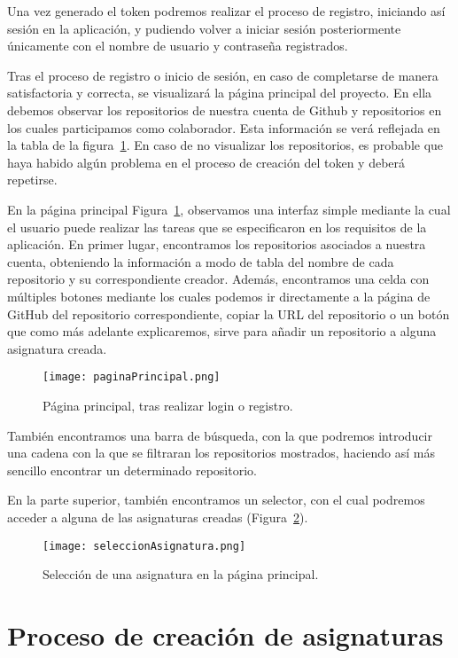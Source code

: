 Una vez generado el token podremos realizar el proceso de registro,
iniciando así sesión en la aplicación, y pudiendo volver a iniciar sesión
posteriormente únicamente con el nombre de usuario y contraseña
registrados.


Tras el proceso de registro o inicio de sesión, en caso de completarse de
manera satisfactoria y correcta, se visualizará la página principal del
proyecto. En ella debemos observar los repositorios de nuestra cuenta de
Github y repositorios en los cuales participamos como colaborador. Esta
información se verá reflejada en la tabla de la
figura~\ref{figure:mainPage}. En caso de no visualizar los repositorios, es
probable que haya habido algún problema en el proceso de creación del token
y deberá repetirse.

En la página principal Figura~\ref{figure:mainPage}, observamos una
interfaz simple mediante la cual el usuario puede realizar las tareas que
se especificaron en los requisitos de la aplicación. En primer lugar,
encontramos los repositorios asociados a nuestra cuenta, obteniendo la
información a modo de tabla del nombre de cada repositorio y su
correspondiente creador. Además, encontramos una celda con múltiples
botones mediante los cuales podemos ir directamente a la página de GitHub
del repositorio correspondiente, copiar la URL del repositorio o un botón
que como más adelante explicaremos, sirve para añadir un repositorio a
alguna asignatura creada.

\begin{figure}[h!]
  \texttt{[image: paginaPrincipal.png]}
  \caption{Página principal, tras realizar login o registro.}
  \label{figure:mainPage}
\end{figure}

También encontramos una barra de búsqueda, con la que podremos introducir
una cadena con la que se filtraran los repositorios mostrados, haciendo así
más sencillo encontrar un determinado repositorio.

En la parte superior, también encontramos un selector, con el cual podremos
acceder a alguna de las asignaturas creadas
(Figura~\ref{figure:mainPageSeleccion}).

\begin{figure}[h!]
  \texttt{[image: seleccionAsignatura.png]}
  \caption{Selección de una asignatura en la página principal.}
  \label{figure:mainPageSeleccion}
\end{figure}


\section{Proceso de creación de asignaturas}

